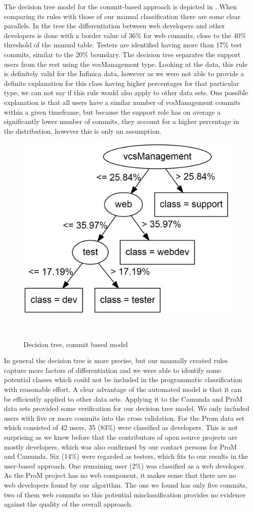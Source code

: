 The decision tree model for the commit-based approach is depicted in . When comparing its rules with those of our manual classification there are some clear parallels. In the tree the differentiation between web developers and other developers is done with a border value of 36\% for web commits, close to the 40\% threshold of the manual table. Testers are identified having more than 17\% test commits, similar to the 20\% boundary. The decision tree separates the support users from the rest using the vcsManagement type. Looking at the data, this rule is definitely valid for the Infinica data, however as we were not able to provide a definite explanation for this class having higher percentages for that particular type, we can not say if this rule would also apply to other data sets. One possible explanation is that all users have a similar number of vcsManagement commits within a given timeframe, but because the support role has on average a significantly lower number of commits, they account for a higher percentage in the distribution, however this is only an assumption.

\begin{figure}
	\centering
	\includegraphics[width=0.6\columnwidth]{figures/commit_tree.png}
	\caption{Decision tree, commit based model}\
	\label{fig:tree}
\end{figure}

In general the decision tree is more precise, but our manually created rules capture more factors of differentiation and we were able to identify some potential classes which could not be included in the programmatic classification with reasonable effort. A clear advantage of the automated model is that it can be efficiently applied to other data sets. Applying it to the Camunda and ProM data sets provided some verification for our decision tree model. We only included users with five or more commits into the cross validation. For the Prom data set which consisted of 42 users, 35 (83\%) were classified
as developers. This is not surprising as we knew before that the contributors
of open source projects are mostly developers, which was also confirmed by our
contact persons for ProM and Camunda. Six (14\%) were regarded as testers,
which fits to our results in the user-based approach. One remaining user (2\%) was classified as a web developer. As the ProM project has no web component, it makes sense that there are no web developers found by our algorithm. The one we found has only five commits, two of them web commits so this potential misclassification provides no evidence against the quality of the overall approach.

